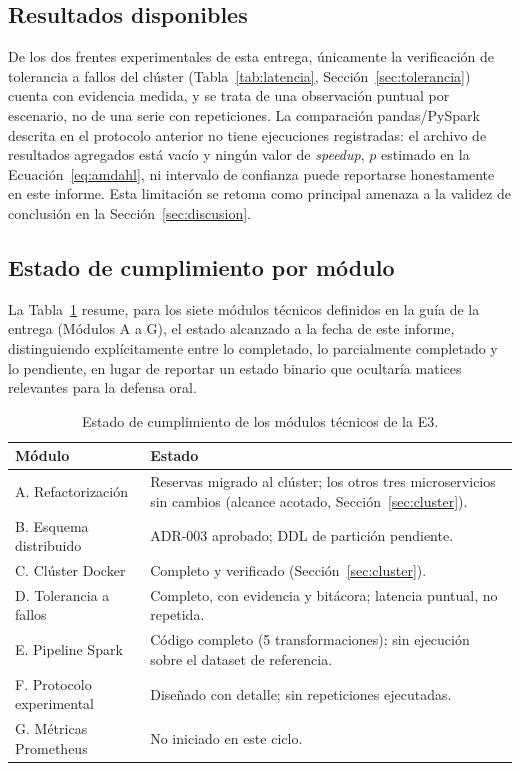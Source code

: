 \documentclass[10pt,twocolumn]{article}
\begin{document}
\subsection{Resultados disponibles}

De los dos frentes experimentales de esta entrega, únicamente la
verificación de tolerancia a fallos del clúster (Tabla~\ref{tab:latencia},
Sección~\ref{sec:tolerancia}) cuenta con evidencia medida, y se trata de
una observación puntual por escenario, no de una serie con repeticiones. La
comparación pandas/PySpark descrita en el protocolo anterior no tiene
ejecuciones registradas: el archivo de resultados agregados está vacío y
ningún valor de \emph{speedup}, $p$ estimado en la Ecuación~\eqref{eq:amdahl},
ni intervalo de confianza puede reportarse honestamente en este informe.
Esta limitación se retoma como principal amenaza a la validez de conclusión
en la Sección~\ref{sec:discusion}.

\subsection{Estado de cumplimiento por módulo}

La Tabla~\ref{tab:modulos} resume, para los siete módulos técnicos
definidos en la guía de la entrega (Módulos A a G), el estado alcanzado a
la fecha de este informe, distinguiendo explícitamente entre lo completado,
lo parcialmente completado y lo pendiente, en lugar de reportar un estado
binario que ocultaría matices relevantes para la defensa oral.

\begin{table}[t]
\centering
\caption{Estado de cumplimiento de los módulos técnicos de la E3.}
\label{tab:modulos}
\small
\begin{tabular}{@{}p{2.6cm}p{5cm}@{}}
\toprule
\textbf{Módulo} & \textbf{Estado} \\
\midrule
A. Refactorización & Reservas migrado al clúster; los otros tres
microservicios sin cambios (alcance acotado, Sección~\ref{sec:cluster}). \\
B. Esquema distribuido & ADR-003 aprobado; DDL de partición pendiente. \\
C. Clúster Docker & Completo y verificado (Sección~\ref{sec:cluster}). \\
D. Tolerancia a fallos & Completo, con evidencia y bitácora; latencia
puntual, no repetida. \\
E. Pipeline Spark & Código completo (5 transformaciones); sin ejecución
sobre el dataset de referencia. \\
F. Protocolo experimental & Diseñado con detalle; sin repeticiones
ejecutadas. \\
G. Métricas Prometheus & No iniciado en este ciclo. \\
\bottomrule
\end{tabular}
\end{table}
\end{document}
